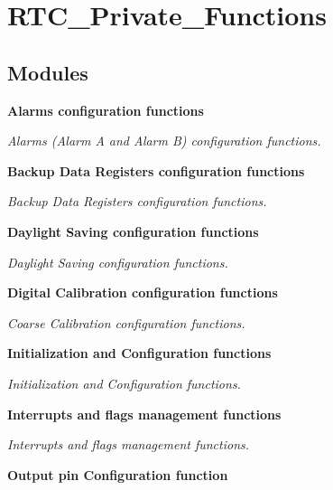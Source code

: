 \section{R\+T\+C\+\_\+\+Private\+\_\+\+Functions}
\label{group__RTC__Private__Functions}
\subsection*{Modules}
\begin{DoxyCompactItemize}
\item 
\textbf{ Alarms configuration functions}
\begin{DoxyCompactList}\small\item\em Alarms (Alarm A and Alarm B) configuration functions. \end{DoxyCompactList}\item 
\textbf{ Backup Data Registers configuration functions}
\begin{DoxyCompactList}\small\item\em Backup Data Registers configuration functions. \end{DoxyCompactList}\item 
\textbf{ Daylight Saving configuration functions}
\begin{DoxyCompactList}\small\item\em Daylight Saving configuration functions. \end{DoxyCompactList}\item 
\textbf{ Digital Calibration configuration functions}
\begin{DoxyCompactList}\small\item\em Coarse Calibration configuration functions. \end{DoxyCompactList}\item 
\textbf{ Initialization and Configuration functions}
\begin{DoxyCompactList}\small\item\em Initialization and Configuration functions. \end{DoxyCompactList}\item 
\textbf{ Interrupts and flags management functions}
\begin{DoxyCompactList}\small\item\em Interrupts and flags management functions. \end{DoxyCompactList}\item 
\textbf{ Output pin Configuration function}

\end{DoxyCompactItemize}

